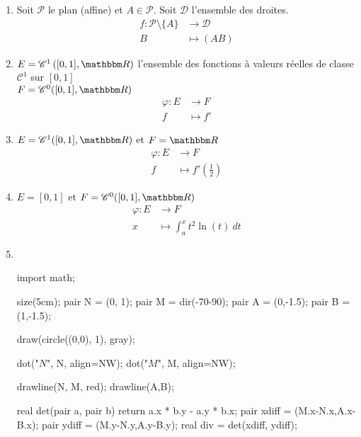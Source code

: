 \begin{exm}
	\begin{enumerate}
		\item Soit $\mathcal{P}$ le plan (affine) et $A \in \mathcal{P}$. Soit $\mathcal{D}$ l'ensemble des droites.\\
			\begin{align*}
				f: \mathcal{P}\setminus\{A\} &\longrightarrow \mathcal{D} \\
				B &\longmapsto (AB)
			\end{align*}
		\item $E = \mathcal{C}^1\left( [0,1], \R \right)$ l'ensemble des fonctions à valeurs réelles de classe $\mathcal{C}^1$ sur $[0,1]$ \\
			$F = \mathcal{C}^0([0,1], \R)$\\
			\begin{align*}
				\varphi: E &\longrightarrow F \\
				f &\longmapsto f'
			\end{align*}
		\item $E = \mathcal{C}^1([0,1], \R)$ et $F = \R$ 
			\begin{align*}
				\varphi: E &\longrightarrow F \\
				f &\longmapsto f'\left(\frac{1}{2}\right)
			\end{align*}
		\item $E = [0,1]$ et $F = \mathcal{C}^0([0,1], \R)$ 
			\begin{align*}
				\varphi: E &\longrightarrow F \\
				x &\longmapsto \int_{a}^{x} t^2\ln(t)~dt 
			\end{align*}
		\item~\\
			\begin{center}
				\begin{asy}
					import math;

					size(5cm);
					pair N = (0, 1);
					pair M = dir(-70-90);
					pair A = (0,-1.5); pair B = (1,-1.5);
					
					draw(circle((0,0), 1), gray);
					
					dot("$N$", N, align=NW);
					dot("$M$", M, align=NW);

					drawline(N, M, red);
					drawline(A,B);

					real det(pair a, pair b) { return a.x * b.y - a.y * b.x; }
					pair xdiff = (M.x-N.x,A.x-B.x);
					pair ydiff = (M.y-N.y,A.y-B.y);
					real div = det(xdiff, ydiff);


\end{asy}
\end{center}
\end{enumerate}
\end{exm}
